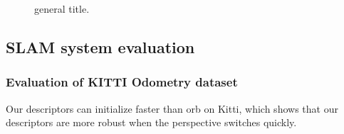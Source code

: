 \documentclass[letterpaper, 10 pt, conference]{ieeeconf}  %
\begin{document}
\begin{figure} 
\centering    
{}     
\caption{ general title. }     
\label{fig}     
\end{figure}

\subsection{SLAM system evaluation}

\subsubsection{Evaluation of KITTI Odometry dataset}
Our descriptors can initialize faster than orb on Kitti, which shows that our descriptors are more robust when the perspective switches quickly.
\end{document}
